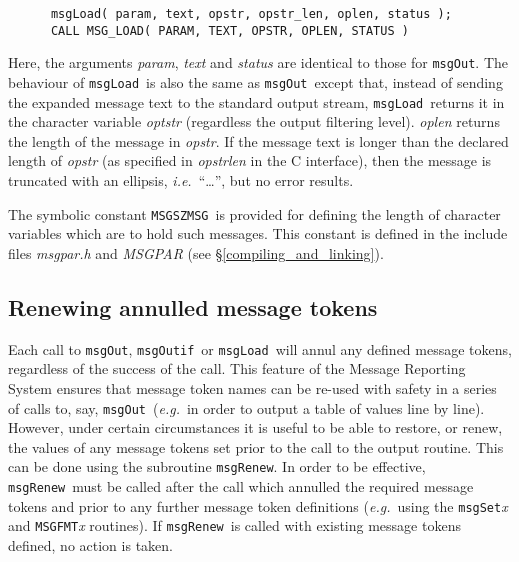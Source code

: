 \documentclass[twoside,11pt]{article}
\newcommand{\htmlref}[2]{#1}
\newcommand{\latex}[1]{#1}
\newcommand{\xlabel}[1]{}
\renewcommand{\_}{\texttt{\symbol{95}}}
\newcommand{\func}[1]{\texttt{#1}}
\newcommand{\farg}[1]{\textit{#1}}
\newcommand{\const}[1]{\texttt{#1}}
\newcommand{\fname}[1]{\textit{#1}}
\newcommand{\msgszmsg}{\const{MSG\_\_SZMSG}}
\newcommand{\msgload}{\func{msgLoad}}
\newcommand{\msgout}{\func{msgOut}}
\newcommand{\msgoutif}{\func{msgOutif}}
\newcommand{\msgrenew}{\func{msgRenew}}
\begin{document}
\begin {small}
\begin{verbatim}
      msgLoad( param, text, opstr, opstr_len, oplen, status );
      CALL MSG_LOAD( PARAM, TEXT, OPSTR, OPLEN, STATUS )
\end{verbatim}
\end {small}

Here, the arguments \farg{param}, \farg{text} and \farg{status} are identical to those for \msgout.
The behaviour of \msgload\ is also the same as \msgout\ except that, instead of
sending the expanded message text to the standard output stream, \msgload\
returns it in the character variable \farg{optstr} (regardless the output filtering
level).
\farg{oplen} returns the length of the message in \farg{opstr}.
If the message text is longer than the declared length of \farg{opstr} (as
specified in \farg{opstr\_len} in the C interface), then the
message is truncated with an ellipsis, \textit{i.e.}\ ``\ldots'', but no error 
results.

The symbolic constant \msgszmsg\ is provided for defining the length of 
character variables which are to hold such messages.
This constant is defined in the include files
\htmlref
{\fname{msg\_par.h} and \fname{MSG\_PAR}}{compiling_and_linking}\latex{ (see \S\ref{compiling_and_linking})}.


\subsection{\xlabel{renewing_annulled_message_tokens}Renewing annulled message tokens}

Each call to \msgout, \msgoutif\ or \msgload\ will annul any defined message 
tokens, regardless of the success of the call.
This feature of the Message Reporting System ensures that message token names
can be re-used with safety in a series of calls to, say, \msgout\ (\textit{e.g.}\ 
in order to output a table of values line by line).
However, under certain circumstances it is useful to be able to restore, or 
renew, the values of any message tokens set prior to the call to the output
routine. This can be done using the subroutine \msgrenew.
In order to be effective, \msgrenew\ must be called after the call
which annulled the required message tokens and prior to any further message
token  definitions (\textit{e.g.}\ using the \func{msgSet}\textit{x} and \func{MSG\_FMT}\textit{x} 
routines). 
If \msgrenew\ is called with existing message tokens defined, no action is
taken.
\end{document}

